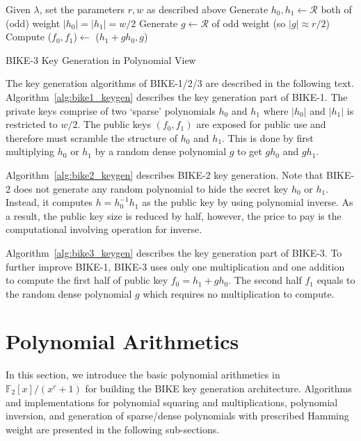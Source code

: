 \documentclass[runningheads]{llncs}
\begin{document}
\begin{algorithm}[!tbh]
 \DontPrintSemicolon %
    Given $\lambda$, set the parameters $r,w$ as described above\;
    Generate $h_0,h_1 \gets \mathcal{R}$ both of (odd) weight $|h_0|=|h_1|=w/2$\;
    Generate $g \gets \mathcal{R}$ of odd weight (so $|g|\approx r/2$)\;
    Compute ($f_0,f_1$)$\gets$ ($h_1+gh_0,g$)\;
 \caption{BIKE-3 Key Generation in Polynomial View  \cite{aragon2017bike}}\label{alg:bike3_keygen}
\end{algorithm}



The key generation algorithms of BIKE-1/2/3 are described in the following text.
Algorithm~\ref{alg:bike1_keygen} describes the key generation part of BIKE-1. The private keys comprise of two `sparse' polynomials $h_0$ and $h_1$ where $|h_0|$ and $|h_1|$ is restricted to $w/2$. The public keys $(f_0,f_1)$ are exposed for public use and therefore must scramble the structure of $h_0$ and $h_1$. This is done by first multiplying $h_0$ or $h_1$ by a random dense polynomial $g$ to get $gh_0$ and $gh_1$.

Algorithm~\ref{alg:bike2_keygen} describes BIKE-2 key generation. Note that BIKE-2 does not generate any random polynomial to hide the secret key $h_0$ or $h_1$. Instead, it computes $h=h_0^{-1}h_1$ as the public key by using polynomial inverse. As a result, the public key size is reduced by half, however, the price to pay is the computational involving operation for inverse.

Algorithm~\ref{alg:bike3_keygen} describes the key generation part of BIKE-3. To further improve BIKE-1, BIKE-3 uses only one multiplication and one addition to compute the first half of public key $f_0=h_1+gh_0$. The second half $f_1$ equals to the random dense polynomial $g$ which requires no multiplication to compute.

\section{Polynomial Arithmetics}
\label{sec::modules}
In this section, we introduce the basic polynomial arithmetics
in $\mathbb{F}_2[x]/(x^r+1)$
for building the BIKE key generation architecture.
Algorithms and implementations for
polynomial squaring and multiplications,
polynomial inversion,
and generation of sparse/dense polynomials with prescribed Hamming weight
are presented in the following sub-sections.
\end{document}
